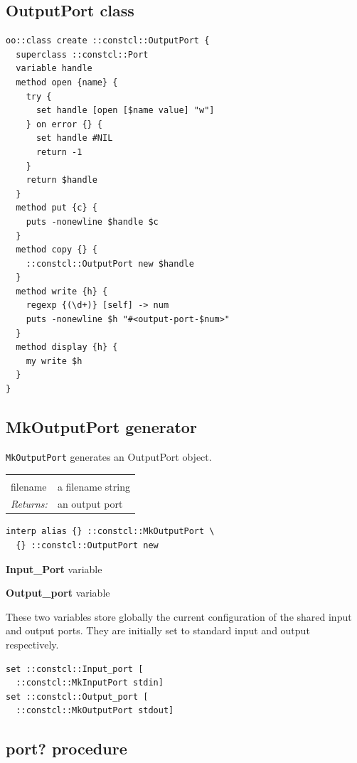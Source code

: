 \documentclass[twoside,9pt]{report}
\begin{document}
\subsection{OutputPort class}
\label{outputport-class}
\begin{lstlisting}
oo::class create ::constcl::OutputPort {
  superclass ::constcl::Port
  variable handle
  method open {name} {
    try {
      set handle [open [$name value] "w"]
    } on error {} {
      set handle #NIL
      return -1
    }
    return $handle
  }
  method put {c} {
    puts -nonewline $handle $c
  }
  method copy {} {
    ::constcl::OutputPort new $handle
  }
  method write {h} {
    regexp {(\d+)} [self] -> num
    puts -nonewline $h "#<output-port-$num>"
  }
  method display {h} {
    my write $h
  }
}
\end{lstlisting}
\subsection{MkOutputPort generator}
\label{mkoutputport-generator}


\texttt{MkOutputPort} generates an OutputPort object.

\noindent\begin{tabular}{ |p{1.9cm} p{8cm}| }
\hline
\rowcolor[HTML]{CCCCCC} \multicolumn{2}{|l|}{\bf MkOutputPort (internal)} \\
filename & a filename string \\
\textit{Returns:} & an output port \\
\hline
\end{tabular}
\begin{lstlisting}
interp alias {} ::constcl::MkOutputPort \
  {} ::constcl::OutputPort new
\end{lstlisting}


\textbf{Input\_Port} variable


\textbf{Output\_port} variable


These two variables store globally the current configuration of the shared input and output ports. They are initially set to standard input and output respectively.

\begin{lstlisting}
set ::constcl::Input_port [
  ::constcl::MkInputPort stdin]
set ::constcl::Output_port [
  ::constcl::MkOutputPort stdout]
\end{lstlisting}
\subsection{port? procedure}
\label{port?-procedure}
\end{document}

